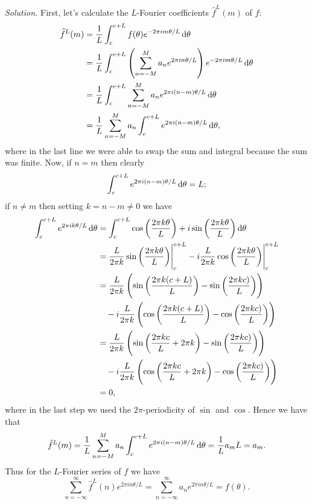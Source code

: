 \documentclass{article}
\begin{document}
\textit{Solution.} First, let's calculate the $L$-Fourier coefficients
$\widehat{f}^L(m)$ of $f$:
%
\begin{align*}
    \widehat{f}^L(m)
    &= \frac{1}{L} \int_c^{c + L} f(\theta) e^{-2 \pi i m \theta / L} \dif \theta \\
    &= \frac{1}{L} \int_c^{c + L} \del{\sum_{n = - M}^M a_n e^{2 \pi i n \theta / L}} e^{-2 \pi i m \theta / L} \dif \theta \\
    &= \frac{1}{L} \int_c^{c + L} \sum_{n = - M}^M a_n e^{2 \pi i (n - m) \theta / L} \dif \theta \\
    &= \frac{1}{L} \sum_{n = - M}^M a_n \int_c^{c + L} e^{2 \pi i (n - m) \theta / L} \dif \theta
    ,
\end{align*}
%
where in the last line we were able to swap the sum and integral because
the sum was finite. Now, if $n = m$ then clearly
%
\begin{equation*}
    \int_c^{c + L} e^{2 \pi i (n - m) \theta / L} \dif \theta = L
    ;
\end{equation*}
%
if $n \neq m$ then setting $k = n - m \neq 0$ we have
%
\begin{align*}
    \int_c^{c + L} e^{2 \pi i k \theta / L} \dif \theta
    &=
    \int_c^{c + L} \cos\del{\frac{2 \pi k \theta}{L}} + i \sin\del{\frac{2 \pi k \theta}{L}} \dif \theta \\
    &=
    \frac{L}{2 \pi k} \eval{\sin\del{\frac{2 \pi k \theta}{L}}}_c^{c + L} - i \frac{L}{2 \pi k} \eval{\cos\del{\frac{2 \pi k \theta}{L}}}_c^{c + L} \\
    &=
    \frac{L}{2 \pi k} \del{\sin\del{\frac{2 \pi k (c + L)}{L}} - \sin\del{\frac{2 \pi k c)}{L}}}
     \\ &\quad- i \frac{L}{2 \pi k} \del{\cos\del{\frac{2 \pi k (c + L)}{L}} - \cos\del{\frac{2 \pi k c)}{L}}}
    \\
    &=
    \frac{L}{2 \pi k} \del{\sin\del{\frac{2 \pi k c}{L} + 2 \pi k} - \sin\del{\frac{2 \pi k c)}{L}}}
     \\ &\quad- i \frac{L}{2 \pi k} \del{\cos\del{\frac{2 \pi k c}{L} + 2 \pi k} - \cos\del{\frac{2 \pi k c)}{L}}}
     \\
    &= 0
    ,
\end{align*}
%
where in the last step we used the $2 \pi$-periodicity of $\sin$ and $\cos$. Hence we have that
%
\begin{equation*}
    \hat{f}^L(m)
    = \frac{1}{L} \sum_{n = - M}^M a_n \int_c^{c + L} e^{2 \pi i (n - m) \theta / L} \dif \theta
    = \frac{1}{L} a_m L
    = a_m
    .
\end{equation*}
%
Thus for the $L$-Fourier series of $f$ we have
%
\begin{equation*}
    \sum_{n = - \infty}^\infty \hat{f}^L(n) e^{2 \pi i n \theta / L}
    =
    \sum_{n = - \infty}^\infty a_n e^{2 \pi i n \theta / L}
    = f(\theta)
    .
\end{equation*}
\end{document}
